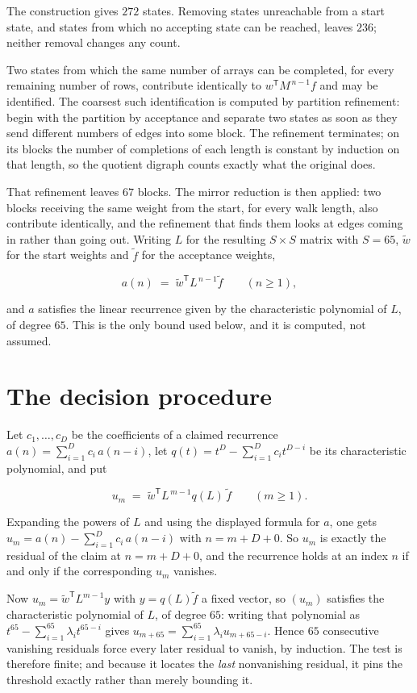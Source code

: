 \documentclass[11pt]{article}
\theoremstyle{definition}
\begin{document}
The construction gives $272$ states. Removing states unreachable from a start state, and states from which no accepting state can be reached, leaves $236$; neither removal changes any count.

Two states from which the same number of arrays can be completed, for every remaining number of rows, contribute identically to $w^{\mathsf T}M^{\,n-1}f$ and may be identified. The coarsest such identification is computed by partition refinement: begin with the partition by acceptance and separate two states as soon as they send different numbers of edges into some block. The refinement terminates; on its blocks the number of completions of each length is constant by induction on that length, so the quotient digraph counts exactly what the original does.

That refinement leaves $67$ blocks. The mirror reduction is then applied: two blocks receiving the same weight from the start, for every walk length, also contribute identically, and the refinement that finds them looks at edges coming in rather than going out. Writing $L$ for the resulting $S \times S$ matrix with $S = 65$, $\tilde w$ for the start weights and $\tilde f$ for the acceptance weights,

\[a(n) \;=\; \tilde w^{\mathsf T} L^{\,n-1} \tilde f \qquad (n \ge 1),\]

and $a$ satisfies the linear recurrence given by the characteristic polynomial of $L$, of degree $65$. This is the only bound used below, and it is computed, not assumed.

\section{The decision procedure}

Let $c_1,\dots,c_D$ be the coefficients of a claimed recurrence $a(n) = \sum_{i=1}^{D} c_i\,a(n-i)$, let $q(t) = t^{D} - \sum_{i=1}^{D} c_i t^{D-i}$ be its characteristic polynomial, and put

\[u_m \;=\; \tilde w^{\mathsf T} L^{\,m-1} q(L)\,\tilde f \qquad (m \ge 1).\]

Expanding the powers of $L$ and using the displayed formula for $a$, one gets $u_m = a(n) - \sum_{i=1}^{D} c_i\,a(n-i)$ with $n = m + D + 0$. So $u_m$ is exactly the residual of the claim at $n = m + D + 0$, and the recurrence holds at an index $n$ if and only if the corresponding $u_m$ vanishes.

Now $u_m = \tilde w^{\mathsf T} L^{m-1} y$ with $y = q(L)\tilde f$ a fixed vector, so $(u_m)$ satisfies the characteristic polynomial of $L$, of degree $65$: writing that polynomial as $t^{65} - \sum_{i=1}^{65} \lambda_i t^{65-i}$ gives $u_{m+65} = \sum_{i=1}^{65} \lambda_i u_{m+65-i}$. Hence $65$ consecutive vanishing residuals force every later residual to vanish, by induction. The test is therefore finite; and because it locates the {\itshape last} nonvanishing residual, it pins the threshold exactly rather than merely bounding it.
\end{document}
